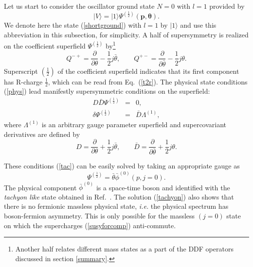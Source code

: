 \documentclass[a4paper,seceq,preprint]{ptptex}
\begin{document}
Let us start to consider the oscillator ground state $N=0$ 
with $l=1$ provided by
\begin{equation}
|V\rangle=|1\rangle\Psi^{(\frac{1}{2})}
(\boldsymbol p,\boldsymbol\theta).
\end{equation}
We denote here the state (\ref{shortground}) with $l=1$ by 
$|1\rangle$ and use this abbreviation in this subsection,
for simplicity. A half of supersymmetry is realized on 
the coefficient superfield $\Psi^{(\frac{1}{2})}$ by\footnote{
Another half relates different mass states as a part of the DDF
operators discussed in section \ref{summary}.
}
 \begin{equation}
  Q^{-+}=\frac{\partial}{\partial\theta}-\frac{1}{2}j\bar\theta,\qquad
  Q^{+-}=\frac{\partial}{\partial\bar\theta}-\frac{1}{2}j\theta.
\label{susyforcomp}
 \end{equation}
Superscript $(\frac{1}{2})$ of the coefficient superfield indicates 
that its first component has R-charge $\frac{1}{2}$, 
which can be read from Eq.~(\ref{t2r}). 
The physical state conditions (\ref{phys}) 
lead manifestly supersymmetric conditions on the superfield:
\begin{subequations}\label{tac}
 \begin{eqnarray}
  D\bar D\Psi^{(\frac{1}{2})}&=&0,\label{taceom}\\
  \delta\Psi^{(\frac{1}{2})}&=&\bar D\Lambda^{(1)},\label{tacgau}
 \end{eqnarray}
\end{subequations}
where $\Lambda^{(1)}$ is an arbitrary gauge parameter superfield
and supercovariant derivatives are defined by
 \begin{equation}
  D=\frac{\partial}{\partial\theta}+\frac{1}{2}j\bar\theta,\qquad
 \bar D=\frac{\partial}{\partial\bar\theta}+\frac{1}{2}j\theta.
\label{supercov}
 \end{equation}

These conditions (\ref{tac}) can be easily solved by taking 
an appropriate gauge as 
\begin{equation}
 \Psi^{(\frac{1}{2})}=\bar\theta\bar\phi^{(0)}(p,j=0).\label{tachyon}
\end{equation}
The physical component $\bar\phi^{(0)}$ is a space-time boson 
and identified with the {\it tachyon like} state obtained 
in Ref.~. The solution (\ref{tachyon}) also shows 
that there is no fermionic massless physical state, 
{\it i.e.} the physical spectrum has boson-fermion asymmetry. 
This is only possible for the massless $(j=0)$ state
on which the supercharges (\ref{susyforcomp}) anti-commute.
\end{document}
